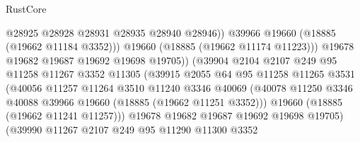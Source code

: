 \begin{lexlean}{RustCore}
\begin{coremodule}
                                        @28925
                                        @28928
                                        @28931
                                        @28935
                                        @28940
                                        @28946))
                                    @39966
                                    @19660
                                    (@18885 (@19662 @11184 @3352)))
                                  @19660
                                  (@18885 (@19662 @11174 @11223)))
                                @19678
                                @19682
                                @19687
                                @19692
                                @19698
                                @19705))
                            (@39904
                              @2104
                              @2107
                              @249
                              @95
                              @11258
                              @11267
                              @3352
                              @11305
                              (@39915
                                @2055
                                @64
                                @95
                                @11258
                                @11265
                                @3531
                                (@40056
                                  @11257
                                  @11264
                                  @3510
                                  @11240
                                  @3346
                                  @40069
                                  (@40078
                                    @11250
                                    @3346
                                    @40088
                                    @39966
                                    @19660
                                    (@18885 (@19662 @11251 @3352)))
                                  @19660
                                  (@18885 (@19662 @11241 @11257)))
                                @19678
                                @19682
                                @19687
                                @19692
                                @19698
                                @19705)
                              (@39990
                                @11267
                                @2107
                                @249
                                @95
                                @11290
                                @11300
                                @3352

\end{coremodule}
\end{lexlean}
